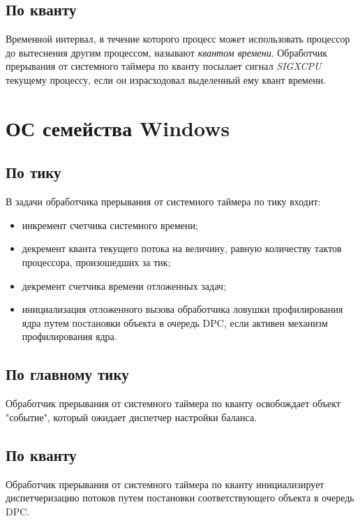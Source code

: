 \subsection{По кванту}

Временной интервал, в течение которого процесс может использовать процессор до вытеснения другим процессом, называют \textit{квантом времени}. Обработчик прерывания от системного таймера по кванту посылает сигнал \textit{SIGXCPU} текущему процессу, если он израсходовал выделенный ему квант времени.

\section{ОС семейства Windows}

\subsection{По тику}

В задачи обработчика прерывания от системного таймера по тику входит:

\begin{itemize}
	\item инкремент счетчика системного времени;
	\item декремент кванта текущего потока на величину, равную количеству
          тактов процессора, произошедших за тик;
	\item декремент счетчика времени отложенных задач;
	\item инициализация отложенного вызова обработчика ловушки профилирования ядра путем постановки объекта в очередь DPC, если активен механизм профилирования ядра.
\end{itemize}

\subsection{По главному тику}

Обработчик прерывания от системного таймера по кванту освобождает объект "событие"{}, который ожидает диспетчер настройки баланса.


\subsection{По кванту}

Обработчик прерывания от системного таймера по кванту инициализирует диспетчеризацию потоков путем постановки соответствующего объекта в очередь DPC.

